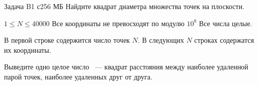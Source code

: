\begin{problem}{Задача B}{1 с}{256 МБ}
Найдите квадрат диаметра множества точек на плоскости.

\Limit

$1 \le N \le 40000$
Все координаты не превосходят по модулю $10^8$
Все числа целые.

\InputFile
В первой строке содержится число точек $N$.
В следующих $N$ строках содержатся их координаты.

\OutputFile
Выведите одно целое число ~--- квадрат расстояния между наиболее
удаленной парой точек, наиболее удаленных друг от друга.

\Example
\begin{example}
\end{example}
\end{problem}
